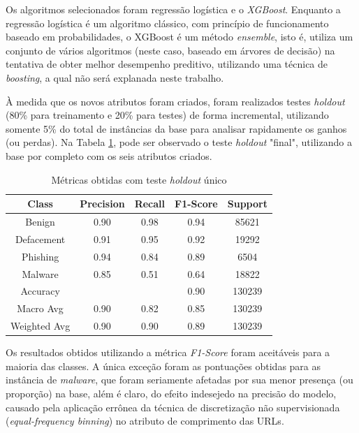 \documentclass[a4paper, 12pt]{article}
\begin{document}
Os algoritmos selecionados foram regressão logística e o \emph{XGBoost}. Enquanto a regressão logística é um algoritmo clássico, com princípio de funcionamento baseado em probabilidades, o XGBoost é um método \emph{ensemble}, isto é, utiliza um conjunto de vários algoritmos (neste caso, baseado em árvores de decisão) na tentativa de obter melhor desempenho preditivo, utilizando uma técnica de \emph{boosting}, a qual não será explanada neste trabalho.

À medida que os novos atributos foram criados, foram realizados testes \emph{holdout} (80\% para treinamento e 20\% para testes) de forma incremental, utilizando somente 5\% do total de instâncias da base para analisar rapidamente os ganhos (ou perdas). Na Tabela \ref{tab:exampleTab1}, pode ser observado o teste \emph{holdout} "final", utilizando a base por completo com os seis atributos criados.

\begin{table}[H]
    \centering
    \caption{Métricas obtidas com teste \emph{holdout} único}
    \vspace{0.3cm}
    \label{tab:exampleTab1}
    \begin{tabular}{c|c|c|c|c}
        \textbf{Class} & \textbf{Precision} & \textbf{Recall} & \textbf{F1-Score} & \textbf{Support}\\
        \hline
        Benign & 0.90 & 0.98 & 0.94 & 85621\\
        Defacement & 0.91 & 0.95 & 0.92 & 19292\\
        Phishing & 0.94 & 0.84 & 0.89 & 6504\\
        Malware & 0.85 & 0.51 & 0.64 & 18822\\
        \hline
        Accuracy &  &  & 0.90 & 130239\\
        Macro Avg & 0.90 & 0.82 & 0.85 & 130239\\
        Weighted Avg & 0.90 & 0.90 & 0.89 & 130239\\
    \end{tabular}
\end{table}

Os resultados obtidos utilizando a métrica \emph{F1-Score} foram aceitáveis para a maioria das classes. A única exceção foram as pontuações obtidas para as instância de \emph{malware}, que foram seriamente afetadas por sua menor presença (ou proporção) na base, além é claro, do efeito indesejedo na precisão do modelo, causado pela aplicação errônea da técnica de discretização não supervisionada (\emph{equal-frequency binning}) no atributo de comprimento das URLs.
\end{document}
